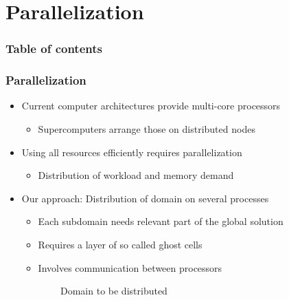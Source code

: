 \section{Parallelization}





\begin{frame}
\frametitle{Table of contents}

\tableofcontents[currentsection]
\end{frame}





\begin{frame}
\frametitle{Parallelization}

\begin{itemize}
\item Current computer architectures provide multi-core processors
  \begin{itemize}
  \item Supercomputers arrange those on distributed nodes
  \end{itemize}
\item Using all resources efficiently requires parallelization
  \begin{itemize}
  \item Distribution of workload and memory demand
  \end{itemize}
\end{itemize}

\begin{itemize}
\item Our approach: Distribution of domain on several processes
  \begin{itemize}
  \item Each subdomain needs relevant part of the global solution
  \item Requires a layer of so called ghost cells
  \item Involves communication between processors
  \end{itemize}
\end{itemize}

\begin{figure}
\begin{subfigure}{.31\textwidth}
  \centering
  \caption{Domain to be distributed}
\end{subfigure}
\hspace{-.9ex}\raisebox{.5em}{\(\longrightarrow\)}
\begin{subfigure}{.3\textwidth}
  \centering
\end{subfigure}
\end{figure}
\end{frame}
